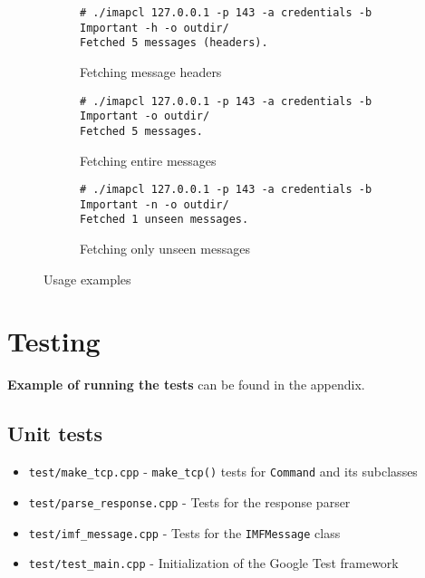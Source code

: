\documentclass[a4]{report}
\begin{document}
\begin{figure}[h!]
\begin{subfigure}{\textwidth}
\begin{mdframed}[backgroundcolor=lightgray]
\begin{verbatim}
# ./imapcl 127.0.0.1 -p 143 -a credentials -b Important -h -o outdir/
Fetched 5 messages (headers).
\end{verbatim}
\end{mdframed}
\caption{Fetching message headers}
\end{subfigure}
\vspace{0.5cm}

\begin{subfigure}{\textwidth}
\begin{mdframed}[backgroundcolor=lightgray]
\begin{verbatim}
# ./imapcl 127.0.0.1 -p 143 -a credentials -b Important -o outdir/
Fetched 5 messages.
\end{verbatim}
\end{mdframed}
\caption{Fetching entire messages}
\end{subfigure}
\vspace{0.5cm}

\begin{subfigure}{\textwidth}
\begin{mdframed}[backgroundcolor=lightgray]
\begin{verbatim}
# ./imapcl 127.0.0.1 -p 143 -a credentials -b Important -n -o outdir/
Fetched 1 unseen messages.
\end{verbatim}
\end{mdframed}
\caption{Fetching only unseen messages}
\end{subfigure}
\caption{Usage examples}
\end{figure}

\chapter{Testing}

\textbf{Example of running the tests} can be found in the appendix.

\section{Unit tests}

\begin{itemize}
\item \texttt{test/make\_tcp.cpp} - \texttt{make\_tcp()} tests for \texttt{Command} and its subclasses
\item \texttt{test/parse\_response.cpp} - Tests for the response parser
\item \texttt{test/imf\_message.cpp} - Tests for the \texttt{IMFMessage} class
\item \texttt{test/test\_main.cpp} - Initialization of the Google Test framework
\end{itemize}
\end{document}
